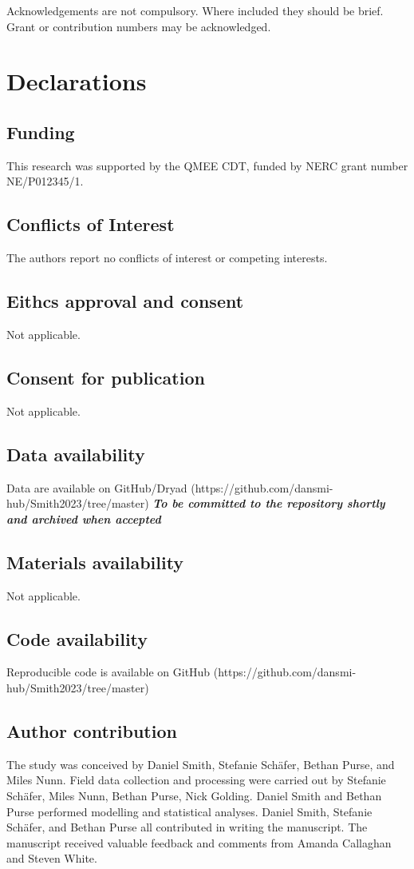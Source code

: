 \documentclass[lineno,sn-basic]{sn-jnl}%
\begin{document}
Acknowledgements are not compulsory. Where included they should be brief. Grant or contribution numbers may be acknowledged.

\section*{Declarations}

\subsection{Funding}
This research was supported by the QMEE CDT, funded by NERC grant number NE/P012345/1.
\subsection{Conflicts of Interest}
The authors report no conflicts of interest or competing interests.
\subsection{Eithcs approval and consent}
Not applicable.
\subsection{Consent for publication}
Not applicable.
\subsection{Data availability}
Data are available on GitHub/Dryad (https://github.com/dansmi-hub/Smith2023/tree/master) \textbf{\textit{To be committed to the repository shortly and archived when accepted}}
\subsection{Materials availability}
Not applicable.
\subsection{Code availability}
Reproducible code is available on GitHub (https://github.com/dansmi-hub/Smith2023/tree/master)
\subsection{Author contribution}
The study was conceived by Daniel Smith, Stefanie Schäfer, Bethan Purse, and Miles Nunn. Field data collection and processing were carried out by Stefanie Schäfer, Miles Nunn, Bethan Purse, Nick Golding. Daniel Smith and Bethan Purse performed modelling and statistical analyses. Daniel Smith, Stefanie Schäfer, and Bethan Purse all contributed in writing the manuscript. The manuscript received valuable feedback and comments from Amanda Callaghan and Steven White.
\end{document}
